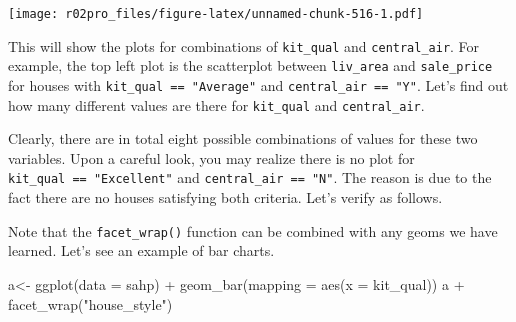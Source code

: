 \documentclass[
]{book}
\newenvironment{Shaded}{\begin{snugshade}}{\end{snugshade}}
\newcommand{\AttributeTok}[1]{\textcolor[rgb]{0.77,0.63,0.00}{#1}}
\newcommand{\CommentTok}[1]{\textcolor[rgb]{0.56,0.35,0.01}{\textit{#1}}}
\newcommand{\FunctionTok}[1]{\textcolor[rgb]{0.00,0.00,0.00}{#1}}
\newcommand{\NormalTok}[1]{#1}
\newcommand{\OtherTok}[1]{\textcolor[rgb]{0.56,0.35,0.01}{#1}}
\newcommand{\SpecialCharTok}[1]{\textcolor[rgb]{0.00,0.00,0.00}{#1}}
\newcommand{\StringTok}[1]{\textcolor[rgb]{0.31,0.60,0.02}{#1}}
\begin{document}
\texttt{[image: r02pro\_files/figure-latex/unnamed-chunk-516-1.pdf]}

This will show the plots for combinations of \texttt{kit\_qual} and \texttt{central\_air}. For example, the top left plot is the scatterplot between \texttt{liv\_area} and \texttt{sale\_price} for houses with \texttt{kit\_qual\ ==\ "Average"} and \texttt{central\_air\ ==\ "Y"}. Let's find out how many different values are there for \texttt{kit\_qual} and \texttt{central\_air}.

\begin{Shaded}
\end{Shaded}

Clearly, there are in total eight possible combinations of values for these two variables. Upon a careful look, you may realize there is no plot for \texttt{kit\_qual\ ==\ "Excellent"} and \texttt{central\_air\ ==\ "N"}. The reason is due to the fact there are no houses satisfying both criteria. Let's verify as follows.

\begin{Shaded}
\end{Shaded}

Note that the \texttt{facet\_wrap()} function can be combined with any geoms we have learned. Let's see an example of bar charts.

\begin{Shaded}
\begin{Highlighting}[]
\NormalTok{a}\OtherTok{\textless{}{-}} \FunctionTok{ggplot}\NormalTok{(}\AttributeTok{data =}\NormalTok{ sahp) }\SpecialCharTok{+} \FunctionTok{geom\_bar}\NormalTok{(}\AttributeTok{mapping =} \FunctionTok{aes}\NormalTok{(}\AttributeTok{x =}\NormalTok{ kit\_qual))}
\NormalTok{a }\SpecialCharTok{+} \FunctionTok{facet\_wrap}\NormalTok{(}\StringTok{"house\_style"}\NormalTok{)}
\end{Highlighting}
\end{Shaded}
\end{document}
